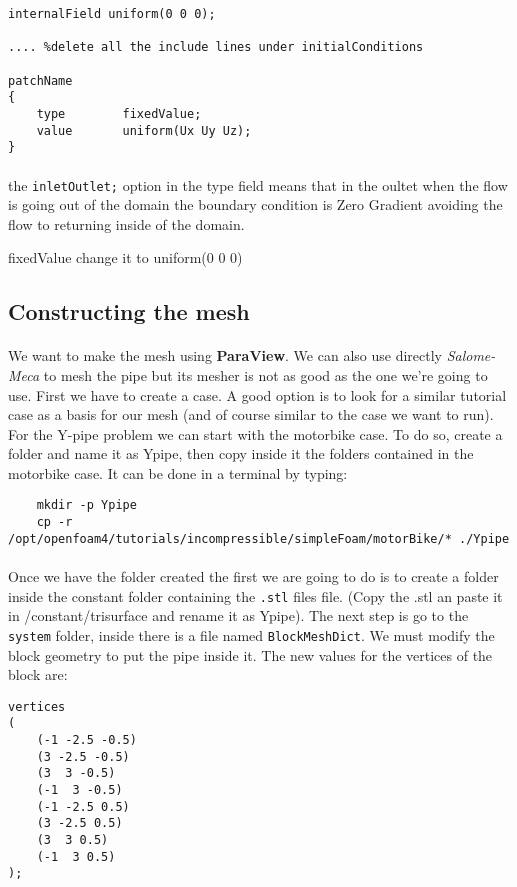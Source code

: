 \begin{lstlisting}
internalField uniform(0 0 0);

.... %delete all the include lines under initialConditions

patchName
{
	type		fixedValue;
	value 		uniform(Ux Uy Uz);
}
\end{lstlisting}
\paragraph{}the \texttt{inletOutlet;} option in the type field means that in the oultet when the flow is going out of the domain the boundary condition is Zero Gradient avoiding the flow to returning inside of the domain.



fixedValue 
change it to uniform(0 0 0)
\subsection{Constructing the mesh}
\paragraph{}We want to make the mesh using \textbf{ParaView}. We can also use directly \emph{Salome-Meca} to mesh the pipe but its mesher is not as good as the one we're going to use. First we have to create a case. A good option is to look for a similar tutorial case as a basis for our mesh (and of course similar to the case we want to run). For the Y-pipe problem we can start with the motorbike case. To do so, create a folder and name it as Ypipe, then copy inside it the folders contained in the motorbike case. It can be done in a terminal by typing:
\begin{scriptsize}
\begin{lstlisting}
	mkdir -p Ypipe
	cp -r /opt/openfoam4/tutorials/incompressible/simpleFoam/motorBike/* ./Ypipe
\end{lstlisting}
\end{scriptsize}

\paragraph{}Once we have the folder created the first we are going to do is to create a folder inside the constant folder containing the \texttt{.stl} files file. (Copy the .stl an paste it in /constant/trisurface and rename it as Ypipe). The next step is  go to the  \texttt{system} folder, inside there is a file named \texttt{BlockMeshDict}. We must modify the block geometry to put the pipe inside it. The new values for the vertices of the block are:
\begin{center}
\begin{lstlisting}
vertices
(
    (-1 -2.5 -0.5)
    (3 -2.5 -0.5)
    (3  3 -0.5)
    (-1  3 -0.5)
    (-1 -2.5 0.5)
    (3 -2.5 0.5)
    (3  3 0.5)
    (-1  3 0.5)
);
\end{lstlisting}
\end{center}
